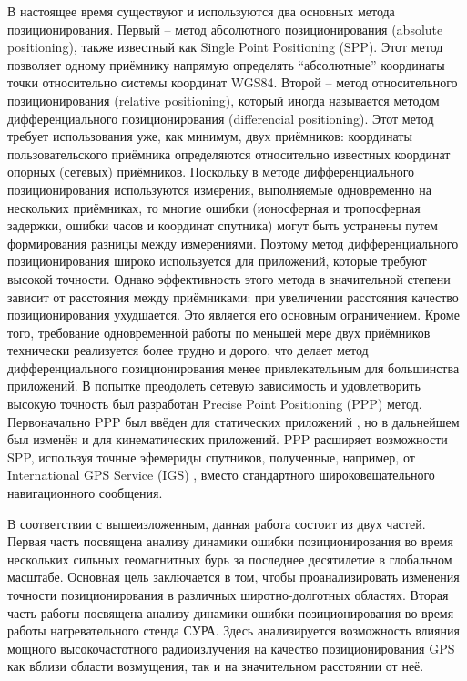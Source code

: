 В настоящее время существуют и используются два основных метода позиционирования.
Первый -- метод абсолютного позиционирования (absolute positioning), также известный как Single Point Positioning (SPP).
Этот метод позволяет одному приёмнику напрямую определять ``абсолютные'' координаты точки относительно системы координат WGS84.
Второй -- метод относительного позиционирования (relative positioning), который иногда называется методом дифференциального позиционирования (differencial positioning). 
Этот метод требует использования уже, как минимум, двух приёмников: координаты пользовательского приёмника определяются относительно известных координат опорных (сетевых) приёмников. 
Поскольку в методе дифференциального позиционирования используются измерения, выполняемые одновременно на нескольких приёмниках, то многие ошибки (ионосферная и тропосферная задержки, ошибки часов и координат спутника) могут быть устранены путем формирования разницы между измерениями. 
Поэтому метод дифференциального позиционирования широко используется для приложений, которые требуют высокой точности.
Однако эффективность этого метода в значительной степени зависит от расстояния между приёмниками: при увеличении расстояния качество позиционирования ухудшается.
Это является его основным ограничением. 
Кроме того, требование одновременной работы по меньшей мере двух приёмников технически реализуется более трудно и дорого, что делает метод дифференциального позиционирования менее привлекательным для большинства приложений.
В попытке преодолеть сетевую зависимость и удовлетворить высокую точность был разработан Precise Point Positioning (PPP) метод.
Первоначально PPP был ввёден для статических приложений \cite{Zumberge1997}, но в дальнейшем был изменён и для кинематических приложений.
PPP расширяет возможности SPP, используя точные эфемериды спутников, полученные, например, от International GPS Service (IGS) \cite{Dow2009}, вместо стандартного широковещательного навигационного сообщения.

В соответствии с вышеизложенным, данная работа состоит из двух частей.
Первая часть посвящена анализу динамики ошибки позиционирования во время нескольких сильных геомагнитных бурь за последнее десятилетие в глобальном масштабе.
Основная цель заключается в том, чтобы проанализировать изменения точности позиционирования в различных широтно-долготных областях.
Вторая часть работы посвящена анализу динамики ошибки позиционирования во время работы нагревательного стенда СУРА.
Здесь анализируется возможность влияния мощного высокочастотного радиоизлучения на качество позиционирования GPS как вблизи области возмущения, так и на значительном расстоянии от неё.